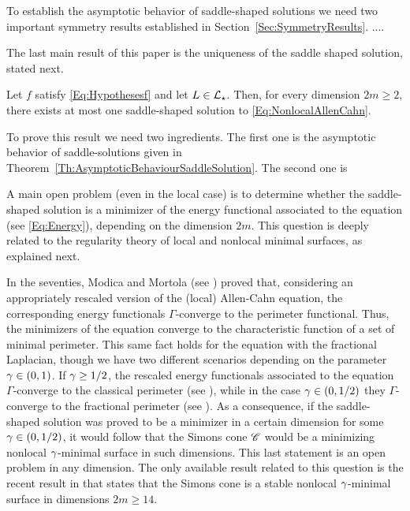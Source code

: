 To establish the asymptotic behavior of saddle-shaped solutions we need two important symmetry results established in Section~\ref{Sec:SymmetryResults}. ....

The last main result of this paper is the uniqueness of the saddle shaped solution, stated next.

\begin{theorem}
	\label{Th:Uniqueness}
    Let $f$ satisfy \eqref{Eq:Hypothesesf} and let $L\in \mathcal{L}_\star$. Then, for every dimension $2m \geq 2$, there exists at most one saddle-shaped solution to \eqref{Eq:NonlocalAllenCahn}.
\end{theorem}

To prove this result we need two ingredients. The first one is the asymptotic behavior of saddle-solutions given in Theorem~\ref{Th:AsymptoticBehaviourSaddleSolution}. The second one is  



A main open problem (even in the local case) is to determine whether the saddle-shaped solution is a minimizer of the energy functional associated to the equation (see \eqref{Eq:Energy}), depending on the dimension $2m$. This question is deeply related to the regularity theory of local and nonlocal minimal surfaces, as explained next.

In the seventies, Modica and Mortola (see \cite{Modica,ModicaMortola}) proved that, considering an appropriately rescaled version of the (local) Allen-Cahn equation, the corresponding energy functionals $\Gamma$-converge to the perimeter functional. Thus, the minimizers of the equation converge to the characteristic function of a set of minimal perimeter. This same fact holds for the equation with the fractional Laplacian, though we have two different scenarios depending on the parameter $\gamma \in (0,1)$. If $\gamma \geq 1/2$, the rescaled energy functionals associated to the equation $\Gamma$-converge to the classical perimeter (see \cite{GiovanniBouchitteSeppecher,Gonzalez}), while in the case $\gamma \in (0,1/2)$ they $\Gamma$-converge to the fractional perimeter (see \cite{SavinValdinoci-GammaConvergence}). As a consequence, if the saddle-shaped solution was proved to be a minimizer in a certain dimension for some $\gamma \in (0,1/2)$, it would follow that the Simons cone $\mathscr{C}$ would be a minimizing nonlocal $\gamma$-minimal surface in such dimensions. This last statement is an open problem in any dimension. The only available result related to this question is the recent result in \cite{Felipe-Sanz-Perela:SaddleFractional} that states that the Simons cone is a stable nonlocal $\gamma$-minimal surface in dimensions $2m\geq 14$.


